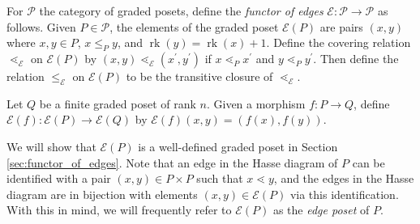 \documentclass[smallextended]{svjour3}       %
\numberwithin{equation}{section}
\newcommand\rk{\operatorname{rk}}
\begin{document}
\begin{definition}
\label{defn:functor_of_edges}
For $\mathcal P$ the category of graded posets, define the {\it functor of edges} $\mathcal{E}\colon\mathcal{P} \rightarrow \mathcal{P}$ as follows. Given $P \in \mathcal P$, the elements of the graded poset $\mathcal{E}(P)$ are pairs $(x, y)$ where $x,y\in P$, $x\le_P y$, and $\rk(y) = \rk(x) + 1$. Define the covering relation $\lessdot_{\mathcal{E}}$ on $\mathcal{E}(P)$ by $(x, y) \lessdot_{\mathcal{E}} (x^\prime, y^\prime)$ if $x\lessdot_P x^\prime$ and $y\lessdot_P y^\prime$. Then define the relation $\le_{\mathcal{E}}$ on $\mathcal{E}(P)$ to be the transitive closure of $\lessdot_{\mathcal{E}}$.

Let $Q$ be a finite graded poset of rank $n$. Given a morphism $f\colon P\rightarrow Q$, define $\mathcal{E}(f)\colon \mathcal{E}(P)\rightarrow \mathcal{E}(Q)$ by $\mathcal{E}(f)(x,y) = (f(x), f(y))$.
\end{definition}

We will show that $\mathcal{E}(P)$ is a well-defined graded poset in Section \ref{sec:functor_of_edges}.  Note that an edge in the Hasse diagram of $P$ can be identified with a pair $(x,y)\in P\times P$ such that $x\lessdot y$, and the edges in the Hasse diagram are in bijection with elements $(x,y)\in \mathcal E(P)$ via this identification.  With this in mind, we will frequently refer to $\mathcal{E}(P)$ as the {\it edge poset} of $P$. 
\end{document}
